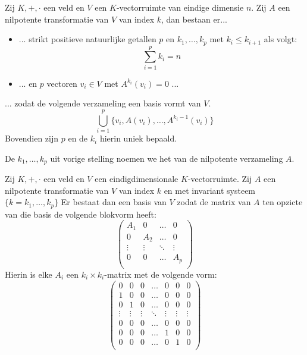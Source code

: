 \documentclass[main.tex]{subfiles}
\begin{document}
\begin{st}
  Zij $K,+,\cdot$ een veld en $V$ een $K$-vectorruimte van eindige dimensie $n$.
  Zij $A$ een nilpotente transformatie van $V$ van index $k$, dan bestaan er...
  \begin{itemize}
  \item ... strikt positieve natuurlijke getallen $p$ en $k_{1}, \dotsc, k_{p}$ met $k_{i} \le k_{i+1}$ als volgt:
    \[ \sum_{i=1}^{p}k_{i} = n \]
  \item ...  en $p$ vectoren $v_{i}\in V$ met $A^{k_{i}}(v_{i}) = 0$ ...
  \end{itemize}
  ... zodat de volgende verzameling een basis vormt van $V$.
  \[ \bigcup_{i=1}^{p} \{ v_{i}, A(v_{i}), \dotsc, A^{k_{i}-1}(v_{i}) \} \]
  Bovendien zijn $p$ en de $k_{i}$ hierin uniek bepaald.
\end{st}

\begin{de}
  De $k_{1}, \dotsc, k_{p}$ uit vorige stelling noemen we het  van de nilpotente verzameling $A$.
\end{de}

\begin{gev}
  Zij $K,+,\cdot$ een veld en $V$ een eindigdimensionale $K$-vectorruimte.
  Zij $A$ een nilpotente transformatie van $V$ van index $k$ en met invariant systeem $\{k =k_{1},\dotsc,k_{p}\}$
  Er bestaat dan een basis van $V$ zodat de matrix van $A$ ten opzicte van die basis de volgende blokvorm heeft:
  \[ 
  \begin{pmatrix}
    A_{1} & 0 & \hdots & 0\\
    0 & A_{2} & \hdots & 0\\
    \vdots & \vdots & \ddots & \vdots\\
    0 & 0 & \hdots & A_{p}\\
  \end{pmatrix}
  \]
  Hierin is elke $A_{i}$ een $k_{i}\times k_{i}$-matrix met de volgende vorm:
  \[ 
  \begin{pmatrix}
    0 & 0 & 0 & \hdots & 0 & 0 & 0\\
    1 & 0 & 0 & \hdots & 0 & 0 & 0\\
    0 & 1 & 0 & \hdots & 0 & 0 & 0\\
    \vdots & \vdots & \vdots & \ddots & \vdots & \vdots & \vdots\\
    0 & 0 & 0 & \hdots & 0 & 0 & 0\\
    0 & 0 & 0 & \hdots & 1 & 0 & 0\\
    0 & 0 & 0 & \hdots & 0 & 1 & 0\\
  \end{pmatrix}
  \]
\end{gev}
\end{document}
